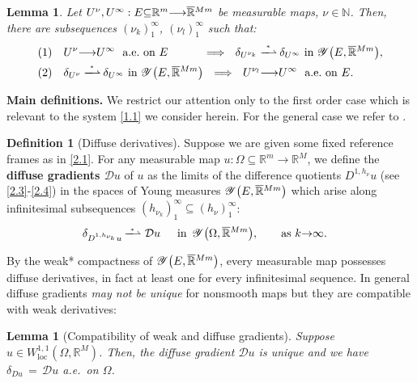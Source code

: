 \documentclass{amsart}
\newtheorem{lemma}[theorem]{Lemma}
\theoremstyle{definition}
\newtheorem{definition}[theorem]{Definition}
\numberwithin{equation}{section}
\begin{document}
\begin{lemma} \label{lemma2} Let  $U^\nu,U^\infty : E{\subseteq} {\mathbb{R}}^m{\longrightarrow} \smash{\overline{\mathbb{R}}}^{Mm}$ be measurable maps, $\nu\in {\mathbb{N}}$. Then, there are subsequences $(\nu_k)_1^\infty$, $(\nu_l)_1^\infty$ such that:
\[
\begin{split}
& (1) \quad U^\nu {\longrightarrow} U^\infty \ \text{ a.e.\ on }E\hspace{31pt} \Longrightarrow \ \ {\delta}_{U^{\nu_k}} \overset{_*}{-\!\!\!\!-\!\!\!\!\rightharpoonup}{\delta}_{U^\infty} \text{ in }{\mathscr{Y}}\big(E,\smash{\overline{\mathbb{R}}}^{Mm}\big),\\
& (2)\quad  {\delta}_{U^{\nu}} \overset{_*}{-\!\!\!\!-\!\!\!\!\rightharpoonup}{\delta}_{U^\infty} \text{ in } {\mathscr{Y}}\big(E,\smash{\overline{\mathbb{R}}}^{Mm}\big) \ \ \Longrightarrow \ \ U^{\nu_l} {\longrightarrow} U^\infty \ \text{ a.e.\ on }E.
\end{split}
\]
\end{lemma}

{\noindent} \textbf{Main definitions.}  We restrict our attention only to the first order case which is relevant to the system \eqref{1.1} we consider herein. For the general case we refer to \cite{K8}.

\begin{definition}[Diffuse derivatives]  \label{definition6}
Suppose we are given some fixed reference frames as in \eqref{2.1}. For any measurable map $u : {\Omega}{\subseteq} {\mathbb{R}}^m{\longrightarrow}{\mathbb{R}}^M$, we define the \textbf{diffuse gradients ${\mathcal{D}} u$} of $u$ as the limits of the difference quotients $D^{1,h_\nu}u$ (see \eqref{2.3}-\eqref{2.4}) in the spaces of Young measures ${\mathscr{Y}}\big(E,\smash{\overline{\mathbb{R}}}^{Mm}\big)$ which arise along infinitesimal subsequences $(h_{\nu_k})_1^\infty {\subseteq} (h_{\nu})_1^\infty$:
\[
\begin{split}
&{\delta}_{D^{1,h_{\nu_k}}u} \, \overset{^*}{\smash{-\!\!\!\!-\!\!\!\!\rightharpoonup}}\ {\mathcal{D}} u\  \ \ \, \text{ in }\,{\mathscr{Y}}\big({\Omega},\smash{\overline{\mathbb{R}}}^{Mm}\big), \ \ \quad  \text{ as }k{\rightarrow} \infty.
\end{split}
\]
\end{definition} 

By the weak* compactness of  ${\mathscr{Y}}\big(E,\smash{\overline{\mathbb{R}}}^{Mm}\big)$, every measurable map possesses diffuse derivatives, in fact at least one for every infinitesimal sequence. In general diffuse gradients \emph{may not be unique} for nonsmooth maps but they are compatible with weak derivatives: 
\begin{lemma}[Compatibility of weak and diffuse gradients] \label{lemma10} Suppose $u \in W^{1,1}_{\text{loc}}({\Omega},{\mathbb{R}}^M)$. Then, the diffuse gradient ${\mathcal{D}} u$ is unique and we have
${\delta}_{Du}\, =\, {\mathcal{D}} u$ a.e.\ on ${\Omega}$.
\end{lemma}
\end{document}
